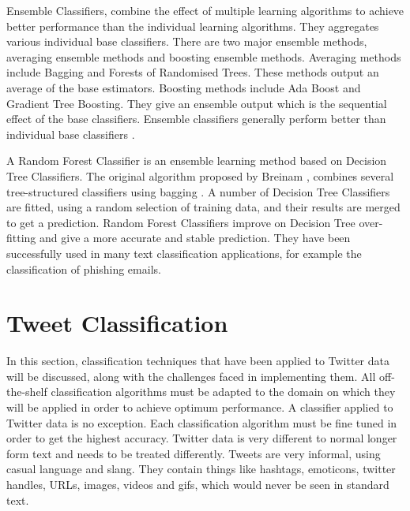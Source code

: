 Ensemble Classifiers, combine the effect of multiple learning algorithms to achieve better performance than the individual learning algorithms. They aggregates various individual base classifiers. There are two major ensemble methods, averaging ensemble methods and boosting ensemble methods. Averaging methods include Bagging and Forests of Randomised Trees. These methods output an average of the base estimators. Boosting methods include Ada Boost and Gradient Tree Boosting. They give an ensemble output which is the sequential effect of the base classifiers. Ensemble classifiers generally perform better than individual base classifiers \cite{Opitz1999}. 

A Random Forest Classifier is an ensemble learning method based on Decision Tree Classifiers. The original algorithm proposed by Breinam \cite{Breiman2001}, combines several tree-structured classifiers using bagging \cite{breiman1996bagging}. A number of Decision Tree Classifiers are fitted, using a random selection of training data, and their results are merged to get a prediction. Random Forest Classifiers improve on Decision Tree over-fitting and give a more accurate and stable prediction. They have been successfully used in many text classification applications, for example the classification of phishing emails.


\section{Tweet Classification}

In this section, classification techniques that have been applied to Twitter data will be discussed, along with the challenges faced in implementing them. All off-the-shelf classification algorithms must be adapted to the domain on which they will be applied in order to achieve optimum performance. A classifier applied to Twitter data is no exception. Each classification algorithm must be fine tuned in order to get the highest accuracy. Twitter data is very different to normal longer form text and needs to be treated differently. Tweets are very informal, using casual language and slang. They contain things like hashtags, emoticons, twitter handles, URLs, images, videos and gifs, which would never be seen in standard text.

